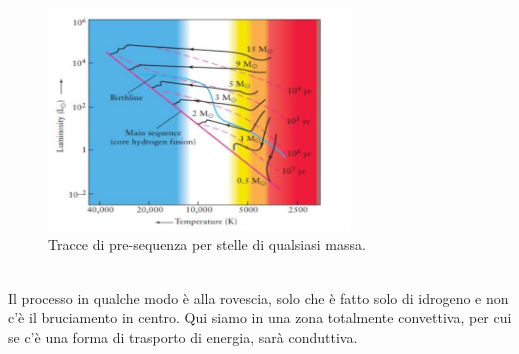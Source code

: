 \documentclass[a4paper,11pt]{article}
\begin{document}
\begin{figure}[h!!]
        \centering
        \includegraphics[width=8cm]{lezione 28 novembre/traccepresequenza2.jpg}
        \caption{Tracce di pre-sequenza per stelle di qualsiasi massa.}
        \label{lezione 28 novembre/traccepresequenza2.jpg}
    \end{figure}
    \\
Il processo in qualche modo è alla rovescia, solo che è fatto solo di idrogeno e non c'è il bruciamento in centro. Qui siamo in una zona totalmente convettiva, per cui se c'è una forma di trasporto di energia, sarà conduttiva. 
\end{document}
